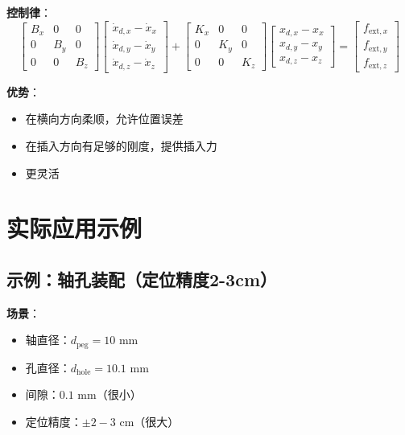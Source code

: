 \documentclass[12pt,a4paper]{article}
\begin{document}
\textbf{控制律}：
\begin{equation}
\begin{bmatrix}
B_x & 0 & 0 \\
0 & B_y & 0 \\
0 & 0 & B_z
\end{bmatrix}
\begin{bmatrix}
\dot{x}_{d,x} - \dot{x}_x \\
\dot{x}_{d,y} - \dot{x}_y \\
\dot{x}_{d,z} - \dot{x}_z
\end{bmatrix}
+
\begin{bmatrix}
K_x & 0 & 0 \\
0 & K_y & 0 \\
0 & 0 & K_z
\end{bmatrix}
\begin{bmatrix}
x_{d,x} - x_x \\
x_{d,y} - x_y \\
x_{d,z} - x_z
\end{bmatrix}
=
\begin{bmatrix}
f_{\text{ext},x} \\
f_{\text{ext},y} \\
f_{\text{ext},z}
\end{bmatrix}
\end{equation}

\textbf{优势}：
\begin{itemize}
\item 在横向方向柔顺，允许位置误差
\item 在插入方向有足够的刚度，提供插入力
\item 更灵活
\end{itemize}

\section{实际应用示例}

\subsection{示例：轴孔装配（定位精度2-3cm）}

\textbf{场景}：
\begin{itemize}
\item 轴直径：$d_{\text{peg}} = 10$ mm
\item 孔直径：$d_{\text{hole}} = 10.1$ mm
\item 间隙：$0.1$ mm（很小）
\item 定位精度：$\pm 2-3$ cm（很大）
\end{itemize}
\end{document}
